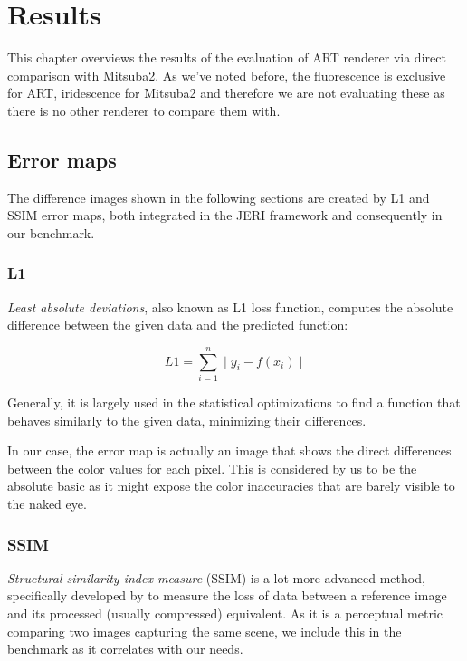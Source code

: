 \chapter{Results}
\label{chap:results}

This chapter overviews the results of the evaluation of ART renderer via direct comparison with Mitsuba2. As we've noted before, the fluorescence is exclusive for ART, iridescence for Mitsuba2 and therefore we are not evaluating these as there is no other renderer to compare them with.

\section{Error maps}

The difference images shown in the following sections are created by L1 and SSIM error maps, both integrated in the JERI framework and consequently in our benchmark. 

\subsection{L1}

\emph{Least absolute deviations}, also known as L1 loss function, computes the absolute difference between the given data and the predicted function:

\begin{equation}
L1=\sum_{i=1}^{n}\mid y_i - f(x_i) \mid
\end{equation}

Generally, it is largely used in the statistical optimizations to find a function that behaves similarly to the given data, minimizing their differences.

In our case, the error map is actually an image that shows the direct differences between the color values for each pixel. This is considered by us to be the absolute basic as it might expose the color inaccuracies that are barely visible to the naked eye.

\subsection{SSIM}
\emph{Structural similarity index measure} (SSIM) is a lot more advanced method, specifically developed by \citet{wang2004image} to measure the loss of data between a reference image and its processed (usually compressed) equivalent. As it is a perceptual metric comparing two images capturing the same scene, we include this in the benchmark as it correlates with our needs.

